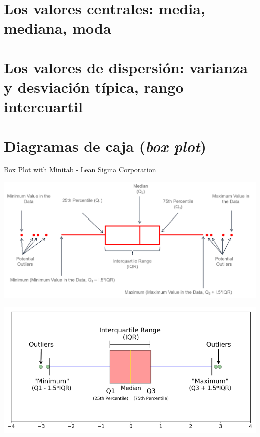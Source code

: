 \documentclass[
  letterpaper,
  DIV=11,
  numbers=noendperiod,
  oneside]{scrreprt}
\begin{document}
\hypertarget{los-valores-centrales-media-mediana-moda}{%
\section{Los valores centrales: media, mediana,
moda}\label{los-valores-centrales-media-mediana-moda}}

\hypertarget{los-valores-de-dispersiuxf3n-varianza-y-desviaciuxf3n-tuxedpica-rango-intercuartil}{%
\section{Los valores de dispersión: varianza y desviación típica, rango
intercuartil}\label{los-valores-de-dispersiuxf3n-varianza-y-desviaciuxf3n-tuxedpica-rango-intercuartil}}

\hypertarget{diagramas-de-caja-box-plot}{%
\section{\texorpdfstring{Diagramas de caja (\emph{box
plot})}{Diagramas de caja (box plot)}}\label{diagramas-de-caja-box-plot}}

\href{https://www.leansigmacorporation.com/box-plot-with-minitab/}{Box
Plot with Minitab - Lean Sigma Corporation}

\includegraphics{01-imagenes/boxplot-minitab.png}

\includegraphics{01-imagenes/boxplot.png}
\end{document}
